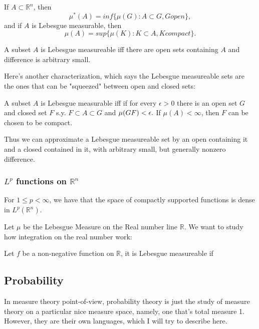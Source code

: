 \documentclass[main.tex]{subfiles}
\begin{document}
\begin{theorem}
If $A \subset \mathbb{R}^n$, then 
$$
\mu^*(A) = inf\{\mu(G): A \subset G, G open\},
$$
and if $A$ is Lebesgue measurable, then 
$$
\mu(A) = sup \{\mu(K): K \subset A, K compact\}.
$$
\end{theorem}

A subset $A$ is Lebesgue measureable iff there are open sets containing $A$ and difference is arbitrary small.

Here's another characterization, which says the Lebesgue measureable sets are the ones that can be "squeezed" between open and closed sets:

\begin{theorem}
A subset $A$ is Lebesgue measurable iff if for every $\epsilon > 0$ there is an open set $G$ and closed set $F$ s.y. $F \subset A \subset G$ and $\mu(G\\F)< \epsilon.$ If $\mu(A) < \infty$, then $F$ can be chosen to be compact.
\end{theorem}

Thus we can approximate a Lebesgue measureable set by an open containing it and a closed contained in it, with arbitrary small, but generally nonzero difference.


\subsubsection{$L^p$ functions on $\mathbb{R}^n$}
\begin{theorem}
For $1 \leq p < \infty$, we have that the space of compactly supported functions is dense in $L^p(\mathbb{R}^n)$.
\end{theorem}

Let $\mu$ be the Lebesgue Measure on the Real number line $\mathbb{R}$. We want to study how integration on the real number work:

\begin{definition}
Let $f$ be a non-negative function on $\mathbb{R}$, it is Lebesgue measureable if 
\end{definition}



\subsection{Probability}
In measure theory point-of-view, probability theory is just the study of measure theory on a particular nice measure space, namely, one that's total measure 1. However, they are their own languages, which I will try to describe here.
\end{document}
